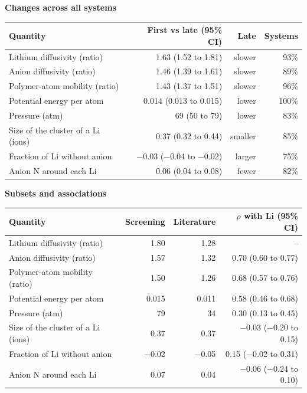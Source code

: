 \textbf{Changes across all systems}\par\smallskip
\begin{tabular}{lrrr}
\toprule
Quantity & First vs late (95\% CI) & Late & Systems \\
\midrule
Lithium diffusivity (ratio) & 1.63 (1.52 to 1.81) & slower & 93\% \\
Anion diffusivity (ratio) & 1.46 (1.39 to 1.61) & slower & 89\% \\
Polymer-atom mobility (ratio) & 1.43 (1.37 to 1.51) & slower & 96\% \\
Potential energy per atom & 0.014 (0.013 to 0.015) & lower & 100\% \\
Pressure (atm) & 69 (50 to 79) & lower & 83\% \\
Size of the cluster of a Li (ions) & 0.37 (0.32 to 0.44) & smaller & 85\% \\
Fraction of Li without anion & $-$0.03 ($-$0.04 to $-$0.02) & larger & 75\% \\
Anion N around each Li & 0.06 (0.04 to 0.08) & fewer & 82\% \\
\bottomrule
\end{tabular}
\par\medskip
\textbf{Subsets and associations}\par\smallskip
\begin{tabular}{lrrr}
\toprule
Quantity & Screening & Literature & $\rho$ with Li (95\% CI) \\
\midrule
Lithium diffusivity (ratio) & 1.80 & 1.28 & -- \\
Anion diffusivity (ratio) & 1.57 & 1.32 & 0.70 (0.60 to 0.77) \\
Polymer-atom mobility (ratio) & 1.50 & 1.26 & 0.68 (0.57 to 0.76) \\
Potential energy per atom & 0.015 & 0.011 & 0.58 (0.46 to 0.68) \\
Pressure (atm) & 79 & 34 & 0.30 (0.13 to 0.45) \\
Size of the cluster of a Li (ions) & 0.37 & 0.37 & $-$0.03 ($-$0.20 to 0.15) \\
Fraction of Li without anion & $-$0.02 & $-$0.05 & 0.15 ($-$0.02 to 0.31) \\
Anion N around each Li & 0.07 & 0.04 & $-$0.06 ($-$0.24 to 0.10) \\
\bottomrule
\end{tabular}
